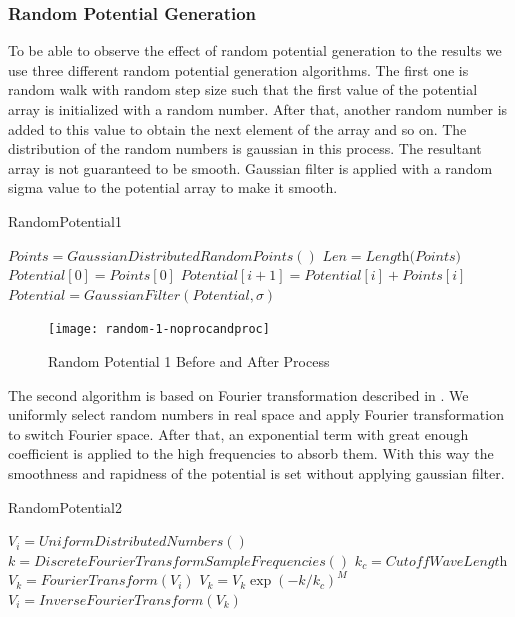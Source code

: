 \documentclass[a4paper,times,hidelinks,12pt]{article}
\begin{document}
\subsubsection{Random Potential Generation}
\label{sec:random_potential_gen}

To be able to observe the effect of random potential generation to the results we use three different random potential generation algorithms. The first one is random walk with random step size such that the first value of the potential array is initialized with a random number. After that, another random number is added to this value to obtain the next element of the array and so on. The distribution of the random numbers is gaussian in this process. The resultant array is not guaranteed to be smooth. Gaussian filter is applied with a random sigma value to the potential array to make it smooth.    

\begin{algorithm}[H]
    \caption{RandomPotential1}\label{euclid}
    \begin{algorithmic}[1]
        \State $ Points = GaussianDistributedRandomPoints()$
        \State $Len = \textit{Length(Points)}$
        \State $Potential[0] = Points[0]$
        \State $Potential[i + 1] = Potential[i] + Points[i]$
        \EndFor
        \State $Potential = GaussianFilter(Potential, \sigma)$ 
    \EndProcedure
    \end{algorithmic}
\label{alg:random_potential_1}
\end{algorithm}

\graphicspath{{"../figs/potentials/"}}
\begin{figure}[H]
    \centering
        \texttt{[image: random-1-noprocandproc]}
\caption{Random Potential 1 Before and After Process}
\label{fig:random1_before_after}
\end{figure}

The second algorithm is based on Fourier transformation described in \cite{akkermans2008numerical}. We uniformly select random numbers in real space and apply Fourier transformation to switch Fourier space. After that, an exponential term with great enough coefficient is applied to the high frequencies to absorb them. With this way the smoothness and rapidness of the potential is set without applying gaussian filter.

\begin{algorithm}[H]
    \caption{RandomPotential2}\label{euclid}
    \begin{algorithmic}[1]
        \State $V_i = UniformDistributedNumbers()$
        \State $k = DiscreteFourierTransformSampleFrequencies()$
        \State $k_c = \textit{CutoffWaveLength}$
        \State $V_k = FourierTransform(V_i)$
        \State $V_k = V_k \exp(-k/k_c)^M$
        \State $V_i = InverseFourierTransform(V_k)$
    \EndProcedure
    \end{algorithmic}
\label{alg:random_potential_1}
\end{algorithm}
\end{document}
